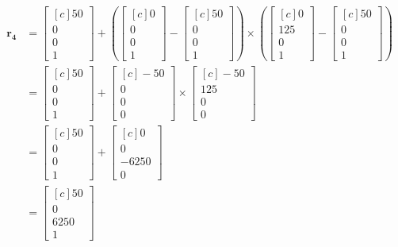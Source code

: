 \documentclass[onecolumn,10pt]{jhwhw}
\begin{document}
\begin{align*}
\bm{r_4} &= 
\begin{bmatrix*}[c]
50 \\
0 \\
0 \\
1 
\end{bmatrix*}
+
\left (
\begin{bmatrix*}[c]
0 \\
0 \\
0 \\
1 
\end{bmatrix*}
-
\begin{bmatrix*}[c]
50 \\
0 \\
0 \\
1 
\end{bmatrix*}
\right )
\times
\left (
\begin{bmatrix*}[c]
0 \\
125 \\
0 \\
1 
\end{bmatrix*}
-
\begin{bmatrix*}[c]
50 \\
0 \\
0 \\
1 
\end{bmatrix*}
\right ) \\
&=
\begin{bmatrix*}[c]
50 \\
0 \\
0 \\
1 
\end{bmatrix*}
+
\begin{bmatrix*}[c]
-50 \\
0 \\
0 \\
0 
\end{bmatrix*}
\times
\begin{bmatrix*}[c]
-50 \\
125 \\
0 \\
0 
\end{bmatrix*}\\
&=
\begin{bmatrix*}[c]
50 \\
0 \\
0 \\
1 
\end{bmatrix*}
+
\begin{bmatrix*}[c]
0 \\
0 \\
-6250 \\
0
\end{bmatrix*}
\\
&=
\begin{bmatrix*}[c]
50 \\
0 \\
6250 \\
1
\end{bmatrix*}
\end{align*}
\end{document}
